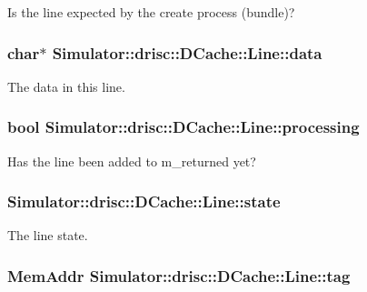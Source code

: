 Is the line expected by the create process (bundle)? 

\hypertarget{struct_simulator_1_1drisc_1_1_d_cache_1_1_line_ad7f38360a631034f0f593998abf0bc1b}{
\subsubsection[{data}]{\setlength{\rightskip}{0pt plus 5cm}char$\ast$ Simulator\+::drisc\+::\+D\+Cache\+::\+Line\+::data}}\label{struct_simulator_1_1drisc_1_1_d_cache_1_1_line_ad7f38360a631034f0f593998abf0bc1b}


The data in this line. 

\hypertarget{struct_simulator_1_1drisc_1_1_d_cache_1_1_line_acd3ee0a50fbab9ff4aee82cb4388db8c}{
\subsubsection[{processing}]{\setlength{\rightskip}{0pt plus 5cm}bool Simulator\+::drisc\+::\+D\+Cache\+::\+Line\+::processing}}\label{struct_simulator_1_1drisc_1_1_d_cache_1_1_line_acd3ee0a50fbab9ff4aee82cb4388db8c}


Has the line been added to m\+\_\+returned yet? 

\hypertarget{struct_simulator_1_1drisc_1_1_d_cache_1_1_line_a3b56655fd184e5f02afddd91c9d6a378}{
\subsubsection[{state}]{ Simulator\+::drisc\+::\+D\+Cache\+::\+Line\+::state}}\label{struct_simulator_1_1drisc_1_1_d_cache_1_1_line_a3b56655fd184e5f02afddd91c9d6a378}


The line state. 

\hypertarget{struct_simulator_1_1drisc_1_1_d_cache_1_1_line_ae479013da253922204974b2bef006dee}{
\subsubsection[{tag}]{\setlength{\rightskip}{0pt plus 5cm}Mem\+Addr Simulator\+::drisc\+::\+D\+Cache\+::\+Line\+::tag}}\label{struct_simulator_1_1drisc_1_1_d_cache_1_1_line_ae479013da253922204974b2bef006dee}


